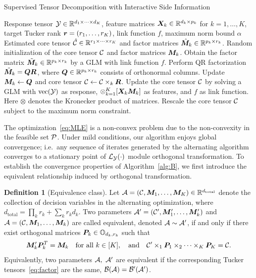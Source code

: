 \documentclass[12pt]{article}
\theoremstyle{definition}
\theoremstyle{definition}
\newtheorem{defn}{Definition}
\begin{document}
\begin{algorithm}[!h]
\caption{Supervised Tensor Decomposition with Interactive Side Information}\label{alg:B}
\begin{algorithmic}[1]
\INPUT Response tensor $\mathcal{Y}\in \mathbb{R}^{d_1\times \cdots \times d_K}$, feature matrices $\bm X_k\in\mathbb{R}^{d_k\times p_k}$ for $k=1,\ldots,K$, target Tucker rank $\bm{r}=(r_1,\ldots,r_K)$, link function $f$, maximum norm bound $\alpha$
\OUTPUT Estimated core tensor $\hat {\mathcal{C}}\in\mathbb{R}^{r_1\times \cdots \times r_K}$ and factor matrices $\hat {\bm M}_k\in\mathbb{R}^{p_k\times r_k}$. 
\State Random initialization of the core tensor $\mathcal{C}$ and factor matrices $\bm M_k$. 
\State Obtain the factor matrix $\tilde {\bm M}_k\in\mathbb{R}^{p_k\times r_k}$ by a GLM with link function $f$.
\State Perform QR factorization $\tilde {\bm M}_k=\bm{Q}\bm{R}$, where $\bm{Q}\in\mathbb{R}^{p_k\times r_k}$ consists of orthonormal columns.
\State Update $\bm M_k\leftarrow \bm{Q}$ and core tensor $\mathcal{C}\leftarrow \mathcal{C}\times_k \bm{R}$.
\EndFor
\State Update the core tensor $\mathcal{C}$ by solving a GLM with $\textup{vec}(\mathcal{Y})$ as response, $\otimes_{k=1}^K[ \bm X_k\bm M_k]$ as features, and $f$ as link function. Here $\otimes$ denotes the Kronecker product of matrices. 
\State Rescale the core tensor $\mathcal{C}$ subject to the maximum norm constraint. 
\EndWhile
\end{algorithmic}
\end{algorithm}

The optimization~\eqref{eq:MLE} is a non-convex problem due to the non-convexity in the feasible set $\mathcal{P}$. Under mild conditions, our algorithm enjoys global convergence; i.e.\ any sequence of iterates generated by the alternating algorithm converges to a stationary point of $\mathcal{L}_{\mathcal{Y}}(\cdot)$ module orthogonal transformation. To establish the convergence properties of Algorithm~\ref{alg:B}, we first introduce the equivalent relationship induced by orthogonal transformation. 

\begin{defn}[Equivalence class]Let $\mathcal{A} = (\mathcal{C}, \bm M_1,\ldots,\bm M_K) \in \mathbb{R}^{d_{\text{total}}}$ denote the collection of decision variables in the alternating optimization, where $d_{\text{total}} = \prod_k r_k + \sum_k r_kd_k$. 
Two parameters $\mathcal{A}'=(\mathcal{C}', \bm M'_1,\ldots,\bm M'_k)$ and $\mathcal{A}=(\mathcal{C}, \bm M_1,\ldots,\bm M_k)$ are called equivalent, denoted $\mathcal{A}\sim \mathcal{A}'$, if and only if there exist orthogonal matrices $\bm{P}_k \in \mathbb{O}_{d_k,r_k}$ such that
\begin{align}\label{eq:equivalance}
	\bm M'_k \bm{P}^T_k = \bm M_k \quad \text{for all }k \in [K], \quad \text{and}\quad \mathcal{C}' \times_1 \bm{P}_1 \times_2  \dots \times_K \bm{P}_K = \mathcal{C}.
\end{align}
Equivalently, two parameters $\mathcal{A},\ \mathcal{A}'$ are equivalent if the corresponding Tucker tensors~\eqref{eq:factor} are the same, $\mathcal{B}(\mathcal{A})=\mathcal{B}'(\mathcal{A}')$. 
\end{defn}
\end{document}
